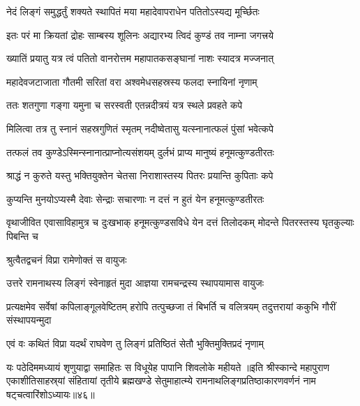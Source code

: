\twolineshloka
{नेदं लिङ्गं समुद्धर्तुं शक्यते स्थापितं मया}
{महादेवापराधेन पतितोऽस्यद्य मूर्च्छितः}%

\twolineshloka
{इतः परं मा क्रियतां द्रोहः साम्बस्य शूलिनः}
{अद्यारभ्य त्विदं कुण्डं तव नाम्ना जगत्त्रये}%

\twolineshloka
{ख्यातिं प्रयातु यत्र त्वं पतितो वानरोत्तम}
{महापातकसङ्घानां नाशः स्यादत्र मज्जनात्}%

\twolineshloka
{महादेवजटाजाता गौतमी सरितां वरा}
{अश्वमेधसहस्रस्य फलदा स्नायिनां नृणाम्}%

\twolineshloka
{ततः शतगुणा गङ्गा यमुना च सरस्वती}
{एतन्नदीत्रयं यत्र स्थले प्रवहते कपे}%

\twolineshloka
{मिलित्वा तत्र तु स्नानं सहस्रगुणितं स्मृतम्}
{नदीष्वेतासु यत्स्नानात्फलं पुंसां भवेत्कपे}%

\twolineshloka
{तत्फलं तव कुण्डेऽस्मिन्स्नानात्प्राप्नोत्यसंशयम्}
{दुर्लभं प्राप्य मानुष्यं हनूमत्कुण्डतीरतः}%

\twolineshloka
{श्राद्धं न कुरुते यस्तु भक्तियुक्तेन चेतसा}
{निराशास्तस्य पितरः प्रयान्ति कुपिताः कपे}%

\twolineshloka
{कुप्यन्ति मुनयोऽप्यस्मै देवाः सेन्द्राः सचारणाः}
{न दत्तं न हुतं येन हनूमत्कुण्डतीरतः}%

\threelineshloka
{वृथाजीवित एवासाविहामुत्र च दुःखभाक्}
{हनूमत्कुण्डसविधे येन दत्तं तिलोदकम्}
{मोदन्ते पितरस्तस्य घृतकुल्याः पिबन्ति च}%



\onelineshloka
{श्रुत्वैतद्वचनं विप्रा रामेणोक्तं स वायुजः}%

\twolineshloka
{उत्तरे रामनाथस्य लिङ्गं स्वेनाहृतं मुदा}
{आज्ञया रामचन्द्रस्य स्थापयामास वायुजः}%

\threelineshloka
{प्रत्यक्षमेव सर्वेषां कपिलाङ्गूलवेष्टितम्}
{हरोपि तत्पुच्छजा तं बिभर्ति च वलित्रयम्}
{तदुत्तरायां ककुभि गौरीं संस्थापयन्मुदा}%


\twolineshloka
{एवं वः कथितं विप्रा यदर्थं राघवेण तु}
{लिङ्गं प्रतिष्ठितं सेतौ भुक्तिमुक्तिप्रदं नृणाम्}%

\twolineshloka
{यः पठेदिममध्यायं शृणुयाद्वा समाहितः}
{स विधूयेह पापानि शिवलोके महीयते}%
॥इति श्रीस्कान्दे महापुराण एकाशीतिसाहस्र्यां संहितायां तृतीये ब्रह्मखण्डे सेतुमाहात्म्ये रामनाथलिङ्गप्रतिष्ठाकारणवर्णनं नाम षट्चत्वारिंशोऽध्यायः॥४६॥



